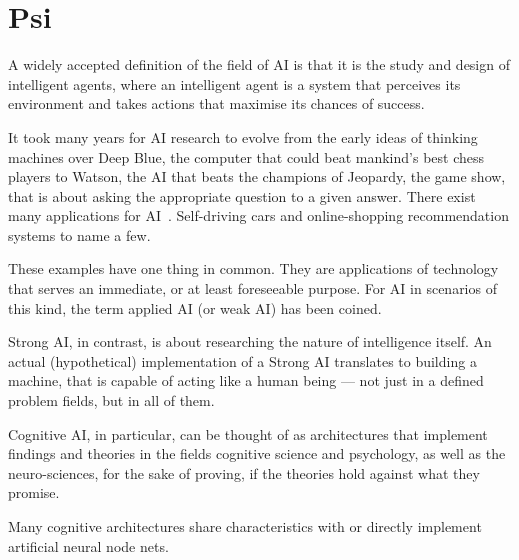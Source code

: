 \chapter{Psi}

A widely accepted definition of the field of AI is that it is the study and design of intelligent agents, where an intelligent agent is a system that perceives its environment and takes actions that maximise its chances of success. %

It took many years for AI research to evolve from the early ideas of thinking machines over Deep Blue, the computer that could beat mankind's best chess players to Watson, the AI that beats the champions of Jeopardy, the game show, that is about asking the appropriate question to a given answer. There exist many applications for AI~. Self-driving cars and online-shopping recommendation systems to name a few.

These examples have one thing in common. They are applications of technology that serves an immediate, or at least foreseeable purpose. For AI in scenarios of this kind, the term applied AI (or weak AI) has been coined.

Strong AI, in contrast, is about researching the nature of intelligence itself. An actual (hypothetical) implementation of a Strong AI translates to building a machine, that is capable of acting like a human being --- not just in a defined problem fields, but in all of them.

Cognitive AI, in particular, can be thought of as architectures that implement findings and theories in the fields cognitive science and psychology, as well as the neuro-sciences, for the sake of proving, if the theories hold against what they promise. 


Many cognitive architectures share characteristics with or directly implement artificial neural node nets.


